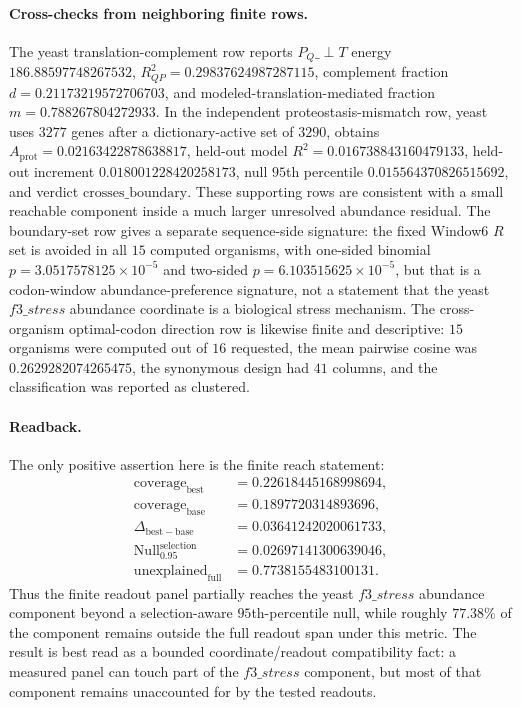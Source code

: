 \paragraph{Cross-checks from neighboring finite rows.}
The yeast translation-complement row reports $P_Q\_\perp T$ energy $186.88597748267532$, $R^2_{QP}=0.29837624987287115$, complement fraction $d=0.21173219572706703$, and modeled-translation-mediated fraction $m=0.788267804272933$.  In the independent proteostasis-mismatch row, yeast uses $3277$ genes after a dictionary-active set of $3290$, obtains $A_{\mathrm{prot}}=0.02163422878638817$, held-out model $R^2=0.016738843160479133$, held-out increment $0.018001228420258173$, null $95$th percentile $0.015564370826515692$, and verdict $\mathrm{crosses\_boundary}$.  These supporting rows are consistent with a small reachable component inside a much larger unresolved abundance residual.  The boundary-set row gives a separate sequence-side signature: the fixed Window6 $R$ set is avoided in all $15$ computed organisms, with one-sided binomial $p=3.0517578125\times 10^{-5}$ and two-sided $p=6.103515625\times 10^{-5}$, but that is a codon-window abundance-preference signature, not a statement that the yeast $f3\_stress$ abundance coordinate is a biological stress mechanism.  The cross-organism optimal-codon direction row is likewise finite and descriptive: $15$ organisms were computed out of $16$ requested, the mean pairwise cosine was $0.2629282074265475$, the synonymous design had $41$ columns, and the classification was reported as clustered.

\paragraph{Readback.}
The only positive assertion here is the finite reach statement:
$$
\begin{aligned}
\mathrm{coverage}_{\mathrm{best}} &= 0.22618445168998694,\\
\mathrm{coverage}_{\mathrm{base}} &= 0.1897720314893696,\\
\Delta_{\mathrm{best-base}} &= 0.03641242020061733,\\
\mathrm{Null}_{0.95}^{\mathrm{selection}} &= 0.02697141300639046,\\
\mathrm{unexplained}_{\mathrm{full}} &= 0.7738155483100131.
\end{aligned}
$$
Thus the finite readout panel partially reaches the yeast $f3\_stress$ abundance component beyond a selection-aware $95$th-percentile null, while roughly $77.38\%$ of the component remains outside the full readout span under this metric.  The result is best read as a bounded coordinate/readout compatibility fact: a measured panel can touch part of the $f3\_stress$ component, but most of that component remains unaccounted for by the tested readouts.

